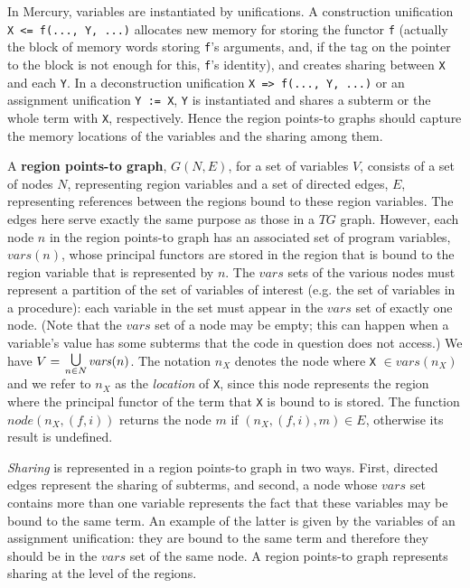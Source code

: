 \documentclass{tlp}
\def\TG{\mathit{TG}}
\def\varset{\mathit{vars}}
\newcommand{\vars}[1]{\ensuremath{\mathit{vars}(#1)}}
\newcommand{\code}[1]{{\tt#1}}
\begin{document}
In Mercury, variables are instantiated by unifications.
A construction unification \code{X <= f(..., Y, ...)}
allocates new memory for storing the functor \code{f}
(actually the block of memory words storing \code{f}'s arguments,
and, if the tag on the pointer to the block is not enough for this,
\code{f}'s identity),
and creates sharing between \code{X} and each \code{Y}.
In a deconstruction unification \code{X => f(..., Y, ...)}
or an assignment unification \code{Y := X},
\code{Y} is instantiated and shares a subterm or the whole term with \code{X},
respectively.
Hence the region points-to graphs should capture
the memory locations of the variables and the sharing among them.

A {\bf region points-to graph}, $G(N, E)$, for a set of variables $V$,
consists of a set of nodes $N$, representing region variables and
a set of directed edges, $E$, representing references between the regions
bound to these region variables.
The edges here serve exactly the same purpose as those in a $\TG$ graph.
However, each node $n$ in the region points-to graph
has an associated set of program variables, $\vars{n}$,
whose principal functors are stored in the region
that is bound to the region variable that is represented by $n$.
The $\varset$ sets of the various nodes
must represent a partition of the set of variables of interest
(e.g. the set of variables in a procedure):
each variable in the set must appear in the $\varset$ set of exactly one node.
(Note that the $\varset$ set of a node may be empty;
this can happen when a variable's value has some subterms
that the code in question does not access.)
We have $V = \hbox{\raise-1mm\hbox{$\textstyle
\bigcup \atop \scriptstyle {n \in N}$}} \vars{n}$.
The notation $n_X$ denotes the node where \code{X} $\in \vars{n_X}$
and we refer to $n_X$ as the \emph{location} of \code{X},
since this node represents the region where
the principal functor of the term that \code{X} is bound to is stored.
The function $\mathit{node}(n_X, (f, i))$
returns the node $m$ if $(n_X, (f,i), m) \in E$,
otherwise its result is undefined.

\emph{Sharing} is represented in a region points-to graph in two ways.
First, directed edges represent the sharing of subterms,
and second, a node whose $\varset$ set contains more than one variable
represents the fact that these variables may be bound to the same term.
An example of the latter is given by
the variables of an assignment unification:
they are bound to the same term and
therefore they should be in the $\varset$ set of the same node.
A region points-to graph represents sharing at the level of the regions.
\end{document}

